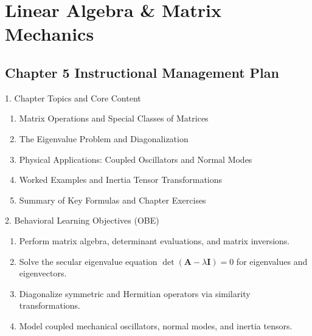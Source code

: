 \chapter{Linear Algebra \& Matrix Mechanics}

\section*{Chapter 5 Instructional Management Plan}

\begin{planbox}[colframe=rbruNavy, colbacktitle=rbruNavy]{1. Chapter Topics and Core Content}
\begin{enumerate}[topsep=2pt, itemsep=1pt, partopsep=0pt, parsep=0pt, leftmargin=1.5em]
    \item Matrix Operations and Special Classes of Matrices
    \item The Eigenvalue Problem and Diagonalization
    \item Physical Applications: Coupled Oscillators and Normal Modes
    \item Worked Examples and Inertia Tensor Transformations
    \item Summary of Key Formulas and Chapter Exercises
\end{enumerate}
\end{planbox}

\begin{planbox}[colframe=rbruGreen, colbacktitle=rbruGreen]{2. Behavioral Learning Objectives (OBE)}
\begin{enumerate}[topsep=2pt, itemsep=1pt, partopsep=0pt, parsep=0pt, leftmargin=1.5em]
    \item Perform matrix algebra, determinant evaluations, and matrix inversions.
    \item Solve the secular eigenvalue equation $\det(\mathbf{A} - \lambda\mathbf{I}) = 0$ for eigenvalues and eigenvectors.
    \item Diagonalize symmetric and Hermitian operators via similarity transformations.
    \item Model coupled mechanical oscillators, normal modes, and inertia tensors.
\end{enumerate}
\end{planbox}

